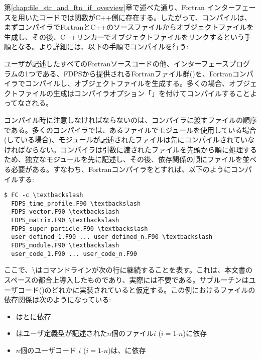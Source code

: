 第\ref{chap:file_str_and_ftn_if_overview}章で述べた通り、Fortran インターフェースを用いたコードでは関数がC++側に存在する。したがって、コンパイルは、まずコンパイラでFortranとC++のソースファイルからオブジェクトファイルを生成し、その後、C++リンカーでオブジェクトファイルをリンクするという手順となる。より詳細には、以下の手順でコンパイルを行う:
\begin{enumerate}[leftmargin=*,label={[\arabic*]}]
 ユーザが記述したすべてのFortranソースコードの他、インターフェースプログラムの1つである、FDPSから提供されるFortranファイル群()を、Fortranコンパイラでコンパイルし、オブジェクトファイルを生成する。多くの場合、オブジェクトファイルの生成はコンパイラオプション「」を付けてコンパイルすることよってなされる。

コンパイル時に注意しなければならないのは、コンパイラに渡すファイルの順序である。多くのコンパイラでは、あるファイルでモジュールを使用している場合(している場合)、モジュールが記述されたファイルは先にコンパイルされていなければならない。コンパイラは引数に渡されたファイルを先頭から順に処理するため、独立なモジュールを先に記述し、その後、依存関係の順にファイルを並べる必要がある。すなわち、Fortranコンパイラをとすれば、以下のようにコンパイルする:
\begin{Verbatim}[commandchars=\\\{\}]
$ FC -c \textbackslash
  FDPS_time_profile.F90 \textbackslash
  FDPS_vector.F90 \textbackslash
  FDPS_matrix.F90 \textbackslash
  FDPS_super_particle.F90 \textbackslash
  user_defined_1.F90 ... user_defined_n.F90 \textbackslash
  FDPS_module.F90 \textbackslash
  user_code_1.F90 ... user_code_n.F90
\end{Verbatim}
ここで、\textbackslash はコマンドラインが次の行に継続することを表す。これは、本文書のスペースの都合上導入したものであり、実際には不要である。サブルーチンはユーザコード()のどれかに実装されていると仮定する。この例におけるファイルの依存関係は次のようになっている:
\begin{itemize}[leftmargin=*]
\item {}はとに依存
\item {}はユーザ定義型が記述された$n$個のファイル$i$ ($i=1$-$n$)に依存
\item $n$個のユーザコード $i$ ($i=1$-$n$)は、に依存
\end{itemize}
\label{enum:compile:ftn_sources}


\end{enumerate}
